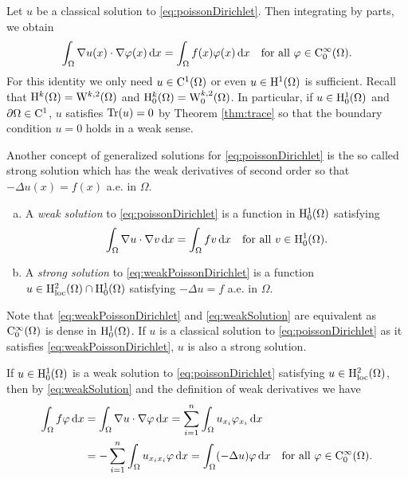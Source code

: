 Let $u$ be a classical solution to \eqref{eq:poissonDirichlet}.
Then integrating by parts, we obtain
\begin{equation}
  \label{eq:weakPoissonDirichlet}
  \int_\Omega \nabla u(x) \cdot \nabla \varphi(x) \, {\operatorname{d}\!{x}} = \int_\Omega f(x) \varphi(x) \, {\operatorname{d}\!{x}} \quad\text{for all } \varphi \in \mathrm{C}_0^\infty(\Omega).
\end{equation}
For this identity we only need $u \in \mathrm{C}^1(\Omega)$ or even $u \in \mathrm{H}^1(\Omega)$ is sufficient.
Recall that $\mathrm{H}^k(\Omega) = \mathrm{W}^{k,2}(\Omega)$ and $\mathrm{H}_0^k(\Omega) = \mathrm{W}_0^{k,2}(\Omega)$.
In particular, if $u \in \mathrm{H}_0^1(\Omega)$ and $\partial\Omega \in \mathrm{C}^1$, $u$ satisfies $\operatorname{Tr}(u) = 0$ by Theorem \ref{thm:trace} so that the boundary condition $u = 0$ holds in a weak sense.

Another concept of generalized solutions for \eqref{eq:poissonDirichlet} is the so called strong solution which has the weak derivatives of second order so that $-\Delta u(x) = f(x)$ a.e. in $\Omega$.

\begin{defn}
  \begin{enumerate}[a)]
    \item A \emph{weak solution} to \eqref{eq:poissonDirichlet} is  a function in $\mathrm{H}_0^1(\Omega)$ satisfying 
      \begin{equation}
        \label{eq:weakSolution}
        \int_\Omega \nabla u \cdot \nabla v \, {\operatorname{d}\!{x}} = \int_\Omega f v \, {\operatorname{d}\!{x}} \quad\text{for all } v \in \mathrm{H}_0^1(\Omega).
      \end{equation}
    \item A \emph{strong solution} to \eqref{eq:weakPoissonDirichlet} is a function $u \in \mathrm{H}_{\operatorname{loc}}^2(\Omega) \cap \mathrm{H}_0^1(\Omega)$ satisfying $-\Delta u = f$ a.e. in $\Omega$.
  \end{enumerate}
\end{defn}

Note that \eqref{eq:weakPoissonDirichlet} and \eqref{eq:weakSolution} are equivalent as $\mathrm{C}_0^\infty(\Omega)$ is dense in $\mathrm{H}_0^1(\Omega)$.
If $u$ is a classical solution to \eqref{eq:poissonDirichlet} as it satisfies \eqref{eq:weakPoissonDirichlet},
$u$ is also a strong solution.

If $u \in \mathrm{H}_0^1(\Omega)$ is a weak solution to \eqref{eq:poissonDirichlet} satisfying $u \in \mathrm{H}_{\operatorname{loc}}^2(\Omega)$, then by \eqref{eq:weakSolution} and the definition of weak derivatives we have
\begin{align*}
\int_\Omega f \varphi \, {\operatorname{d}\!{x}}
&= \int_\Omega \nabla u \cdot \nabla \varphi \, {\operatorname{d}\!{x}}
= \sum_{i = 1}^n \int_\Omega u_{x_i} \varphi_{x_i} \, {\operatorname{d}\!{x}} \\
&= -\sum_{i = 1}^n \int_\Omega u_{x_i x_i} \varphi\, {\operatorname{d}\!{x}} 
= \int_\Omega (-\Delta u) \varphi \, {\operatorname{d}\!{x}} \quad \text{for all } \varphi \in \mathrm{C}_0^\infty(\Omega).
\end{align*}

